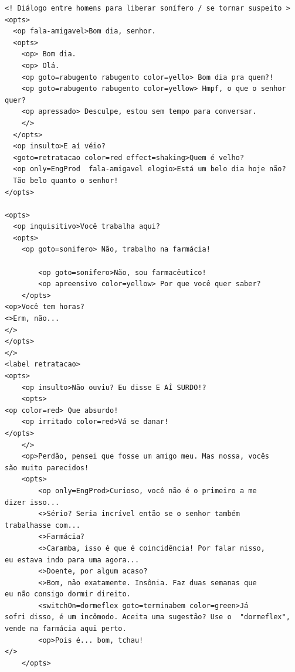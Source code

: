 {\footnotesize
\begin{verbatim}
<! Diálogo entre homens para liberar sonífero / se tornar suspeito >
<opts>
  <op fala-amigavel>Bom dia, senhor.
  <opts>
    <op> Bom dia.
    <op> Olá.
    <op goto=rabugento rabugento color=yello> Bom dia pra quem?!
    <op goto=rabugento rabugento color=yellow> Hmpf, o que o senhor quer?
    <op apressado> Desculpe, estou sem tempo para conversar.
    </>
  </opts>
  <op insulto>E aí véio?
  <goto=retratacao color=red effect=shaking>Quem é velho?
  <op only=EngProd  fala-amigavel elogio>Está um belo dia hoje não?
  Tão belo quanto o senhor!
</opts>

<opts>
  <op inquisitivo>Você trabalha aqui?
  <opts>
    <op goto=sonifero> Não, trabalho na farmácia!
		
		<op goto=sonifero>Não, sou farmacêutico!
		<op apreensivo color=yellow> Por que você quer saber?
	</opts>
<op>Você tem horas?
<>Erm, não...
</>
</opts>
</>
<label retratacao>
<opts>
	<op insulto>Não ouviu? Eu disse E AÍ SURDO!?
	<opts>
<op color=red> Que absurdo!
	<op irritado color=red>Vá se danar!
</opts>
	</>
	<op>Perdão, pensei que fosse um amigo meu. Mas nossa, vocês
são muito parecidos!
	<opts>
		<op only=EngProd>Curioso, você não é o primeiro a me
dizer isso...
		<>Sério? Seria incrível então se o senhor também
trabalhasse com...
		<>Farmácia?
		<>Caramba, isso é que é coincidência! Por falar nisso,
eu estava indo para uma agora...
		<>Doente, por algum acaso?
		<>Bom, não exatamente. Insônia. Faz duas semanas que
eu não consigo dormir direito.
		<switchOn=dormeflex goto=terminabem color=green>Já
sofri disso, é um incômodo. Aceita uma sugestão? Use o  "dormeflex",
vende na farmácia aqui perto.
		<op>Pois é... bom, tchau!
</>
	</opts>


\end{verbatim}}
